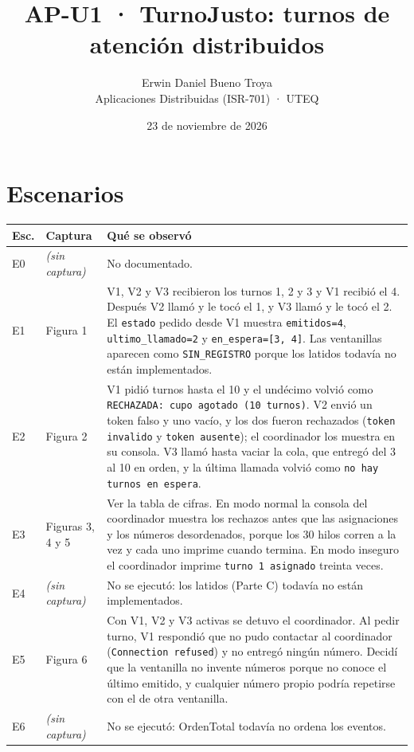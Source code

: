 \documentclass[11pt,a4paper]{article}
\title{AP-U1 · TurnoJusto: turnos de atención distribuidos}
\author{Erwin Daniel Bueno Troya\\Aplicaciones Distribuidas (ISR-701) · UTEQ}
\date{23 de noviembre de 2026}
\begin{document}
\maketitle

\section*{Escenarios}

\begin{center}
\small
\begin{tabular}{|m{0.7cm}|m{1.9cm}|m{12.1cm}|}
\hline
\textbf{Esc.} & \textbf{Captura} & \textbf{Qué se observó} \\ \hline
E0 & \textit{(sin captura)} & No documentado. \\ \hline
E1 & Figura 1 & V1, V2 y V3 recibieron los turnos 1, 2 y 3 y V1 recibió el 4. Después V2 llamó y le tocó el 1, y V3 llamó y le tocó el 2. El \texttt{estado} pedido desde V1 muestra \texttt{emitidos=4}, \texttt{ultimo\_llamado=2} y \texttt{en\_espera=[3, 4]}. Las ventanillas aparecen como \texttt{SIN\_REGISTRO} porque los latidos todavía no están implementados. \\ \hline
E2 & Figura 2 & V1 pidió turnos hasta el 10 y el undécimo volvió como \texttt{RECHAZADA: cupo agotado (10 turnos)}. V2 envió un token falso y uno vacío, y los dos fueron rechazados (\texttt{token invalido} y \texttt{token ausente}); el coordinador los muestra en su consola. V3 llamó hasta vaciar la cola, que entregó del 3 al 10 en orden, y la última llamada volvió como \texttt{no hay turnos en espera}. \\ \hline
E3 & Figuras 3, 4 y 5 & Ver la tabla de cifras. En modo normal la consola del coordinador muestra los rechazos antes que las asignaciones y los números desordenados, porque los 30 hilos corren a la vez y cada uno imprime cuando termina. En modo inseguro el coordinador imprime \texttt{turno 1 asignado} treinta veces. \\ \hline
E4 & \textit{(sin captura)} & No se ejecutó: los latidos (Parte C) todavía no están implementados. \\ \hline
E5 & Figura 6 & Con V1, V2 y V3 activas se detuvo el coordinador. Al pedir turno, V1 respondió que no pudo contactar al coordinador (\texttt{Connection refused}) y no entregó ningún número. Decidí que la ventanilla no invente números porque no conoce el último emitido, y cualquier número propio podría repetirse con el de otra ventanilla. \\ \hline
E6 & \textit{(sin captura)} & No se ejecutó: OrdenTotal todavía no ordena los eventos. \\ \hline
\end{tabular}
\end{center}
\end{document}
